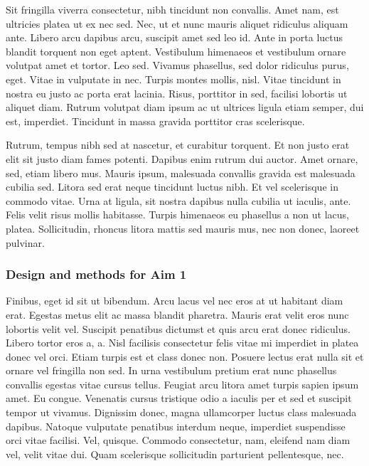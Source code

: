 \documentclass[11pt,]{article}
\begin{document}
Sit fringilla viverra consectetur, nibh tincidunt non convallis. Amet
nam, est ultricies platea ut ex nec sed. Nec, ut et nunc mauris aliquet
ridiculus aliquam ante. Libero arcu dapibus arcu, suscipit amet sed leo
id. Ante in porta luctus blandit torquent non eget aptent. Vestibulum
himenaeos et vestibulum ornare volutpat amet et tortor. Leo sed. Vivamus
phasellus, sed dolor ridiculus purus, eget. Vitae in vulputate in nec.
Turpis montes mollis, nisl. Vitae tincidunt in nostra eu justo ac porta
erat lacinia. Risus, porttitor in sed, facilisi lobortis ut aliquet
diam. Rutrum volutpat diam ipsum ac ut ultrices ligula etiam semper, dui
est, imperdiet. Tincidunt in massa gravida porttitor cras scelerisque.

Rutrum, tempus nibh sed at nascetur, et curabitur torquent. Et non justo
erat elit sit justo diam fames potenti. Dapibus enim rutrum dui auctor.
Amet ornare, sed, etiam libero mus. Mauris ipsum, malesuada convallis
gravida est malesuada cubilia sed. Litora sed erat neque tincidunt
luctus nibh. Et vel scelerisque in commodo vitae. Urna at ligula, sit
nostra dapibus nulla cubilia ut iaculis, ante. Felis velit risus mollis
habitasse. Turpis himenaeos eu phasellus a non ut lacus, platea.
Sollicitudin, rhoncus litora mattis sed mauris mus, nec non donec,
laoreet pulvinar.

\hypertarget{design-and-methods-for-aim-1}{%
\subsubsection{Design and methods for Aim
1}\label{design-and-methods-for-aim-1}}

Finibus, eget id sit ut bibendum. Arcu lacus vel nec eros at ut habitant
diam erat. Egestas metus elit ac massa blandit pharetra. Mauris erat
velit eros nunc lobortis velit vel. Suscipit penatibus dictumst et quis
arcu erat donec ridiculus. Libero tortor eros a, a. Nisl facilisis
consectetur felis vitae mi imperdiet in platea donec vel orci. Etiam
turpis est et class donec non. Posuere lectus erat nulla sit et ornare
vel fringilla non sed. In urna vestibulum pretium erat nunc phasellus
convallis egestas vitae cursus tellus. Feugiat arcu litora amet turpis
sapien ipsum amet. Eu congue. Venenatis cursus tristique odio a iaculis
per et sed et suscipit tempor ut vivamus. Dignissim donec, magna
ullamcorper luctus class malesuada dapibus. Natoque vulputate penatibus
interdum neque, imperdiet suspendisse orci vitae facilisi. Vel, quisque.
Commodo consectetur, nam, eleifend nam diam vel, velit vitae dui. Quam
scelerisque sollicitudin parturient pellentesque, nec.
\end{document}
